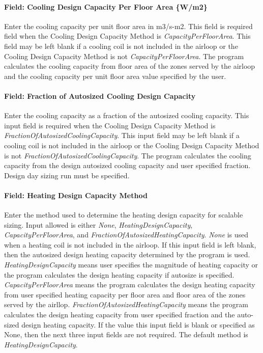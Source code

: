 \paragraph{Field: Cooling Design Capacity Per Floor Area \{W/m2\}}\label{field-cooling-design-capacity-per-floor-area-wm2-1}

Enter the cooling capacity per unit floor area in m3/s-m2. This field is required field when the Cooling Design Capacity Method is \emph{CapacityPerFloorArea}. This field may be left blank if a cooling coil is not included in the airloop or the Cooling Design Capacity Method is not \emph{CapacityPerFloorArea}. The program calculates the cooling capacity from floor area of the zones served by the airloop and the cooling capacity per unit floor area value specified by the user.

\paragraph{Field: Fraction of Autosized Cooling Design Capacity}\label{field-fraction-of-autosized-cooling-design-capacity-1}

Enter the cooling capacity as a fraction of the autosized cooling capacity. This input field is required when the Cooling Design Capacity Method is \emph{FractionOfAutosizedCoolingCapacity}. This input field may be left blank if a cooling coil is not included in the airloop or the Cooling Design Capacity Method is not \emph{FractionOfAutosizedCoolingCapacity}. The program calculates the cooling capacity from the design autosized cooling capacity and user specified fraction. Design day sizing run must be specified.

\paragraph{Field: Heating Design Capacity Method}\label{field-heating-design-capacity-method-1}

Enter the method used to determine the heating design capacity for scalable sizing. Input allowed is either \emph{None}, \emph{HeatingDesignCapacity}, \emph{CapacityPerFloorArea}, and \emph{FractionOfAutosizedHeatingCapacity}. \emph{None} is used when a heating coil is not included in the airloop. If this input field is left blank, then the autosized design heating capacity determined by the program is used. \emph{HeatingDesignCapacity} means user specifies the magnitude of heating capacity or the program calculates the design heating capacity if autosize is specified. \emph{CapacityPerFloorArea} means the program calculates the design heating capacity from user specified heating capacity per floor area and floor area of the zones served by the airllop. \emph{FractionOfAutosizedHeatingCapacity} means the program calculates the design heating capacity from user specified fraction and the auto-sized design heating capacity. If the value this input field is blank or specified as None, then the next three input fields are not required. The default method is \emph{HeatingDesignCapacity}.

